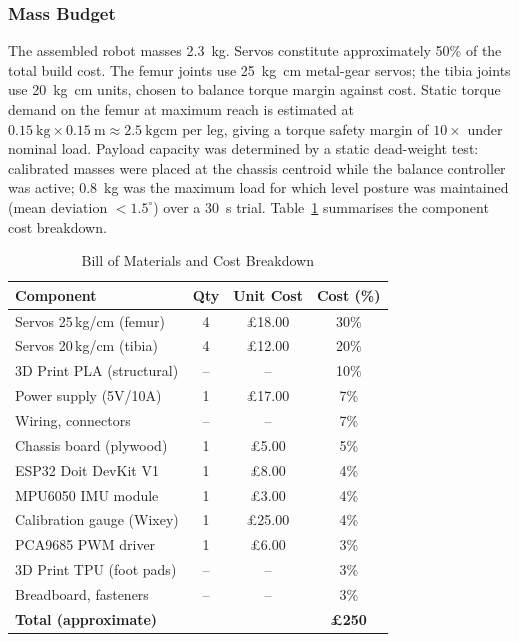 \documentclass[journal]{IEEEtran}
\newcommand{\dg}{^{\circ}}
\begin{document}
\subsubsection{Mass Budget}
The assembled robot masses \SI{2.3}{\kilogram}.
Servos constitute approximately 50\% of the total build cost.
The femur joints use \SI{25}{\kilo\gram\centi\metre} metal-gear
servos; the tibia joints use \SI{20}{\kilo\gram\centi\metre}
units, chosen to balance torque margin against cost.
Static torque demand on the femur at maximum reach is
estimated at $\SI{0.15}{\kilo\gram}\times\SI{0.15}{\metre}
\approx\SI{2.5}{\kilo\gram\centi\metre}$ per leg, giving a
torque safety margin of $10\times$ under nominal load.
Payload capacity was determined by a static dead-weight test:
calibrated masses were placed at the chassis centroid while
the balance controller was active; \SI{0.8}{\kilo\gram} was
the maximum load for which level posture was maintained
(mean deviation $<1.5\dg$) over a \SI{30}{\second} trial.
Table~\ref{tab:cost} summarises the component cost breakdown.
\begin{table}[!t]
\caption{Bill of Materials and Cost Breakdown}
\label{tab:cost}
\centering
\begin{tabular}{lccc}
\toprule
\textbf{Component} & \textbf{Qty} & \textbf{Unit Cost} & \textbf{Cost (\%)} \\
\midrule
Servos 25\,kg/cm (femur)   & 4  & \pounds18.00 & 30\% \\
Servos 20\,kg/cm (tibia)   & 4  & \pounds12.00 & 20\% \\
3D Print PLA (structural)  & -- & --           & 10\% \\
Power supply (5V/10A)      & 1  & \pounds17.00 &  7\% \\
Wiring, connectors         & -- & --           &  7\% \\
Chassis board (plywood)    & 1  &  \pounds5.00 &  5\% \\
ESP32 Doit DevKit V1       & 1  &  \pounds8.00 &  4\% \\
MPU6050 IMU module         & 1  &  \pounds3.00 &  4\% \\
Calibration gauge (Wixey)  & 1  & \pounds25.00 &  4\% \\
PCA9685 PWM driver         & 1  &  \pounds6.00 &  3\% \\
3D Print TPU (foot pads)   & -- & --           &  3\% \\
Breadboard, fasteners      & -- & --           &  3\% \\
\midrule
\multicolumn{3}{l}{\textbf{Total (approximate)}} & \textbf{\pounds250} \\
\bottomrule
\end{tabular}
\end{table}
\end{document}

